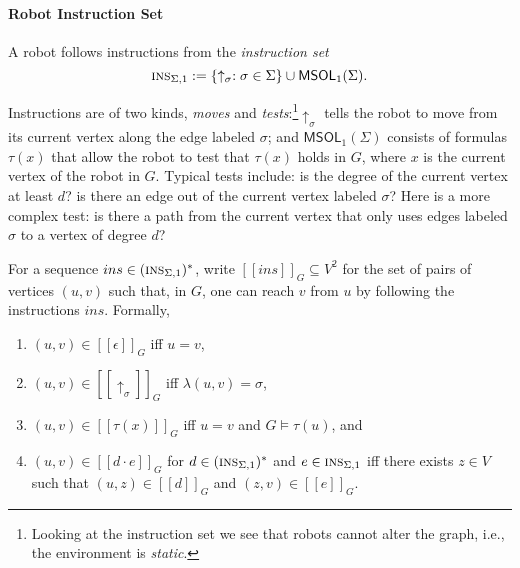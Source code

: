 \documentclass{aamas2015}
\def\nat{\mathbb{N}}
\def\ins{\textsc{ins}}
\def\msol{\mathsf{MSOL}}
\newcommand{\sr}[1]{\footnote{{\color{red} Note. #1}}}
\begin{document}


%

\paragraph{Robot Instruction Set}

A robot follows instructions from the {\em instruction set}
\[
\ins_{\Sigma,1} := \{\uparrow_\sigma : \sigma \in \Sigma\} \cup \msol_1(\Sigma).
\]

Instructions are of two kinds, {\em moves} and {\em tests}:\footnote{Looking at the instruction set we see that robots cannot alter the graph, i.e., the environment is {\em static}.}$\uparrow_\sigma$ tells the robot to move from its current vertex along the edge labeled $\sigma$; and $\msol_1(\Sigma)$ consists of formulas $\tau(x)$ that allow the robot to test that $\tau(x)$ holds in $G$,  where $x$ is the current vertex of the robot in $G$. Typical tests include: is the degree of the current vertex at least $d$? is there an edge out of the current vertex labeled $\sigma$? Here is a more complex test: is there a path from the current vertex that only uses edges labeled $\sigma$ to a vertex of degree $d$?


For a sequence $ins \in (\ins_{\Sigma,1})^*$, write $[[ins]]_G \subseteq V^2$ for the set of pairs of vertices $(u,v)$ such that, in $G$, one can reach $v$ from $u$ by following the instructions $ins$. Formally, 
\begin{enumerate}
\item $(u,v) \in [[\epsilon]]_G$ iff $u = v$,
\item $(u,v) \in [[\uparrow_\sigma]]_G$ iff $\lambda(u,v) = \sigma$, 
\item $(u,v) \in [[\tau(x)]]_G$ iff $u = v$ and $G \models \tau(u)$, and
\item $(u,v) \in [[d \cdot e]]_G$ for $d \in (\ins_{\Sigma,1})^*$ and $e \in \ins_{\Sigma,1}$ iff there exists $z \in V$ such that $(u,z) \in [[d]]_G$ and $(z,v) \in [[e]]_G$.
\end{enumerate}
\end{document}
